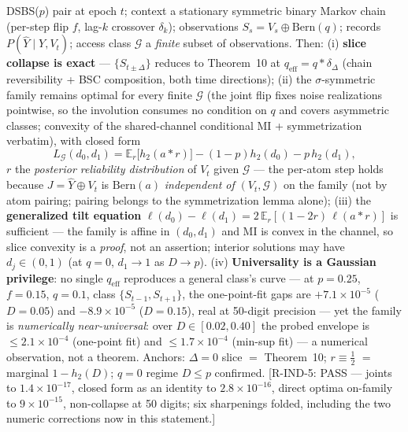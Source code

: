 ﻿\documentclass[11pt]{article}
\theoremstyle{remark}
\begin{document}
\begin{theorem}
\label{thm:bintwin}
DSBS($p$) pair at epoch $t$; context a stationary symmetric binary
Markov chain (per-step flip $f$, lag-$k$ crossover $\delta_k$);
observations $S_s=V_s\oplus\mathrm{Bern}(q)$; records
$P(\hat Y\mid Y,V_t)$; access class $\mathcal G$ a \emph{finite}
subset of observations. Then: (i) \textbf{slice collapse is exact} ---
$\{S_{t\pm\Delta}\}$ reduces to Theorem~10 at $q_{\mathrm{eff}}
=q*\delta_\Delta$ (chain reversibility + BSC composition, both time
directions); (ii) the $\sigma$-symmetric family remains optimal for
every finite $\mathcal G$ (the joint flip fixes noise realizations
pointwise, so the involution consumes no condition on $q$ and covers
asymmetric classes; convexity of the shared-channel conditional MI +
symmetrization verbatim), with closed form
\[
L_{\mathcal G}(d_0,d_1)=\mathbb E_r\bigl[h_2(a*r)\bigr]
-(1-p)h_2(d_0)-p\,h_2(d_1),
\]
$r$ the \emph{posterior reliability distribution} of $V_t$ given
$\mathcal G$ --- the per-atom step holds because
$J=\hat Y\oplus V_t$ is $\mathrm{Bern}(a)$ \emph{independent of}
$(V_t,\mathcal G)$ on the family (not by atom pairing; pairing
belongs to the symmetrization lemma alone); (iii) the
\textbf{generalized tilt equation}
$\ell(d_0)-\ell(d_1)=2\,\mathbb E_r[(1-2r)\,\ell(a*r)]$ is sufficient
--- the family is affine in $(d_0,d_1)$ and MI is convex in the
channel, so slice convexity is a \emph{proof}, not an assertion;
interior solutions may have $d_j\in(0,1)$ (at $q=0$, $d_1\to1$ as
$D\to p$). (iv) \textbf{Universality is a Gaussian privilege}: no
single $q_{\mathrm{eff}}$ reproduces a general class's curve --- at
$p{=}0.25$, $f{=}0.15$, $q{=}0.1$, class $\{S_{t-1},S_{t+1}\}$, the
one-point-fit gaps are $+7.1\times10^{-5}$ ($D{=}0.05$) and
$-8.9\times10^{-5}$ ($D{=}0.15$), real at 50-digit precision --- yet
the family is \emph{numerically near-universal}: over
$D\in[0.02,0.40]$ the probed envelope is $\le2.1\times10^{-4}$
(one-point fit) and $\le1.7\times10^{-4}$ (min-sup fit) --- a
numerical observation, not a theorem. Anchors: $\Delta{=}0$ slice
$=$ Theorem~10; $r\equiv\tfrac12$ $=$ marginal $1-h_2(D)$; $q=0$
regime $D\le p$ confirmed. [R-IND-5: PASS --- joints to
$1.4\times10^{-17}$, closed form as an identity to
$2.8\times10^{-16}$, direct optima on-family to $9\times10^{-15}$,
non-collapse at 50 digits; six sharpenings folded, including the two
numeric corrections now in this statement.]
\end{theorem}
\end{document}

